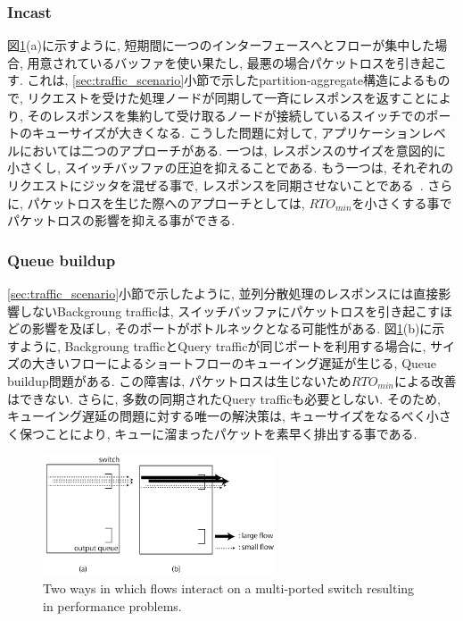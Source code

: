 \documentclass[11pt, a4paper, twocolumn]{jsarticle}
\begin{document}
\subsubsection{Incast}
\label{subsec:incast}
図\ref{fig:impair}(a)に示すように, 短期間に一つのインターフェースへとフローが集中した場合, 用意されているバッファを使い果たし,
最悪の場合パケットロスを引き起こす.
これは, \ref{sec:traffic_scenario}小節で示したpartition-aggregate構造によるもので,
リクエストを受けた処理ノードが同期して一斉にレスポンスを返すことにより,
そのレスポンスを集約して受け取るノードが接続しているスイッチでのポートのキューサイズが大きくなる.
こうした問題に対して, アプリケーションレベルにおいては二つのアプローチがある.
一つは, レスポンスのサイズを意図的に小さくし, スイッチバッファの圧迫を抑えることである.
もう一つは, それぞれのリクエストにジッタを混ぜる事で, レスポンスを同期させないことである~\cite{synchro}.
さらに, パケットロスを生じた際へのアプローチとしては, $RTO_{min}$を小さくする事でパケットロスの影響を抑える事ができる.

\subsubsection{Queue buildup}
\label{subsec:queue}
\ref{sec:traffic_scenario}小節で示したように, 並列分散処理のレスポンスには直接影響しないBackgroung trafficは,
スイッチバッファにパケットロスを引き起こすほどの影響を及ぼし, そのポートがボトルネックとなる可能性がある.
図\ref{fig:impair}(b)に示すように, Backgroung trafficとQuery trafficが同じポートを利用する場合に,
サイズの大きいフローによるショートフローのキューイング遅延が生じる, Queue buildup問題がある.
この障害は, パケットロスは生じないため$RTO_{min}$による改善はできない.
さらに, 多数の同期されたQuery trafficも必要としない.
そのため, キューイング遅延の問題に対する唯一の解決策は, キューサイズをなるべく小さく保つことにより, キューに溜まったパケットを素早く排出する事である.

\begin{figure}[h]
    \begin{center}
    \includegraphics[autoebb, width=195pt]{./img/impairments.pdf}
    \caption{Two ways in which flows interact on a multi-ported switch
    resulting in performance problems.}
    \label{fig:impair}
    \end{center}
\end{figure}
\end{document}
